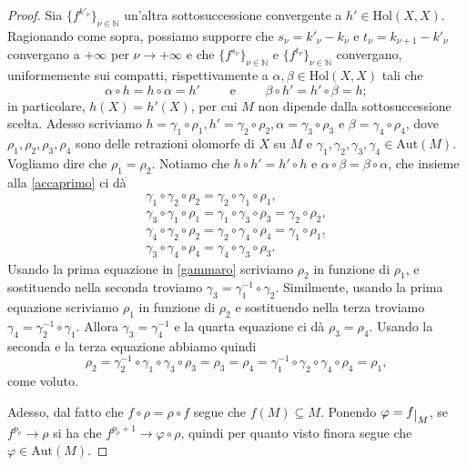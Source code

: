 \begin{proof}
    Sia $\{f^{k'_\nu}\}_{\nu\in\mathbb{N}}$ un'altra sottosuccessione convergente a $h'\in\text{Hol}(X,X)$. Ragionando come sopra, possiamo supporre che $s_\nu=k'_\nu-k_\nu$ e $t_\nu=k_{\nu+1}-k'_\nu$ convergano a $+\infty$ per $\nu\longrightarrow+\infty$ e che $\{f^{s_\nu}\}_{\nu\in\mathbb{N}}$ e $\{f^{t_\nu}\}_{\nu\in\mathbb{N}}$ convergano, uniformemente sui compatti, rispettivamente a $\alpha,\beta \in \text{Hol}(X,X)$ tali che
    \begin{equation}\label{accaprimo}
        \alpha\circ h=h\circ\alpha=h' \qquad\text{ e }\qquad \beta\circ h'=h'\circ\beta=h;
    \end{equation}
    in particolare, $h(X)=h'(X)$, per cui $M$ non dipende dalla sottosuccessione scelta. Adesso scriviamo $h=\gamma_1\circ\rho_1,h'=\gamma_2\circ\rho_2,\alpha=\gamma_3\circ\rho_3$ e $\beta=\gamma_4\circ\rho_4$, dove $\rho_1,\rho_2,\rho_3,\rho_4$ sono delle retrazioni olomorfe di $X$ su $M$ e $\gamma_1,\gamma_2,\gamma_3,\gamma_4\in\text{Aut}(M)$. Vogliamo dire che $\rho_1=\rho_2$. Notiamo che $h\circ h'=h'\circ h$ e $\alpha\circ\beta=\beta\circ\alpha$, che insieme alla \eqref{accaprimo} ci dà
    \begin{equation}\label{gammaro}\begin{split}
        \gamma_1\circ\gamma_2\circ\rho_2=\gamma_2\circ\gamma_1\circ\rho_1,\\
        \gamma_3\circ\gamma_1\circ\rho_1=\gamma_1\circ\gamma_3\circ\rho_3=\gamma_2\circ\rho_2,\\
        \gamma_4\circ\gamma_2\circ\rho_2=\gamma_2\circ\gamma_4\circ\rho_4=\gamma_1\circ\rho_1,\\
        \gamma_3\circ\gamma_4\circ\rho_4=\gamma_4\circ\gamma_3\circ\rho_3.
    \end{split}\end{equation}
    Usando la prima equazione in \eqref{gammaro} scriviamo $\rho_2$ in funzione di $\rho_1$, e sostituendo nella seconda troviamo $\gamma_3=\gamma_1^{-1}\circ\gamma_2$. Similmente, usando la prima equazione scriviamo $\rho_1$ in funzione di $\rho_2$ e sostituendo nella terza troviamo $\gamma_4=\gamma_2^{-1}\circ\gamma_1$. Allora $\gamma_3=\gamma_4^{-1}$ e la quarta equazione ci dà $\rho_3=\rho_4$. Usando la seconda e la terza equazione abbiamo quindi
    $$\rho_2=\gamma_2^{-1}\circ\gamma_1\circ\gamma_3\circ\rho_3=\rho_3=\rho_4=\gamma_1^{-1}\circ\gamma_2\circ\gamma_4\circ\rho_4=\rho_1,$$
    come voluto.

    Adesso, dal fatto che $f\circ\rho=\rho\circ f$ segue che $f(M)\subseteq M$. Ponendo $\varphi=f\restrict{M}$, se $f^{p_\nu}\longrightarrow\rho$ si ha che $f^{p_\nu+1}\longrightarrow\varphi\circ\rho$, quindi per quanto visto finora segue che $\varphi\in\text{Aut}(M)$.


\end{proof}
